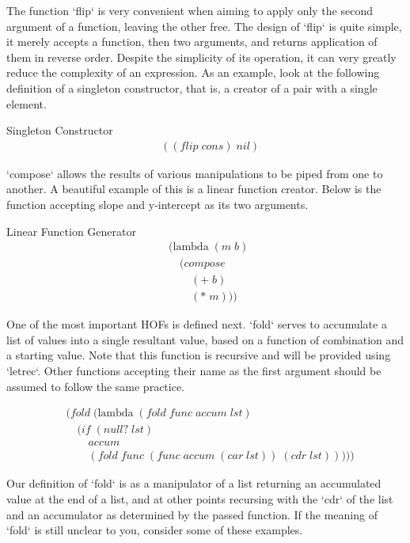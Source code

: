 The function `flip` is very convenient when aiming to apply only the second 
argument of a function, leaving the other free. The design of `flip` is quite 
simple, it merely accepts a function, then two arguments, and returns application 
of them in reverse order. Despite the simplicity of its operation, it can very 
greatly reduce the complexity of an expression. As an example, look at the 
following definition of a singleton constructor, that is, a creator of a pair with 
a single element.

Singleton Constructor
\begin{align*}
& ((flip \; cons) \; nil)
\end{align*}


`compose` allows the results of various manipulations to be piped from one to 
another. A beautiful example of this is a linear function creator. Below is the 
function accepting slope and y-intercept as its two arguments.

Linear Function Generator
\begin{align*}
& (\text{lambda} \; (m \; b) \; 
\\& \quad (compose \; 
\\& \qquad (+ \; b) \; 
\\& \qquad (* \; m)))
\end{align*}

One of the most important HOFs is defined next. `fold` serves to accumulate a list 
of values into a single resultant value, based on a function of combination and a 
starting value. Note that this function is recursive and will be provided using 
`letrec`. Other functions accepting their name as the first argument should be 
assumed to follow the same practice.

\begin{align*}
& (fold \; (\text{lambda} \; (fold \; func \; accum \; lst)
\\& \quad (if \; (null? \; lst)
\\& \qquad accum
\\& \qquad (fold \; func \; (func \; accum \; (car \; lst)) \; (cdr \; lst)))))
\end{align*}

Our definition of `fold` is as a manipulator of a list returning an accumulated 
value at the end of a list, and at other points recursing with the `cdr` of the 
list and an accumulator as determined by the passed function. If the meaning of 
`fold` is still unclear to you, consider some of these examples.

